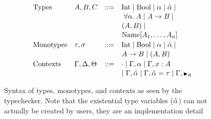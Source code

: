 \begin{figure}[h]
  \centering
  \begin{minipage}{0.5\textwidth}
  \[
      \begin{array}{llcl}
      \text{Types} & A, B, C & \bnfas &
            \Inttype \bnfalt \Booltype \bnfalt \alpha \bnfalt \ahat \bnfalt 
            \\[1pt] &&&\!\!\!\;\;\;
            \alltype{\alpha}{A} \bnfalt A \arr B \bnfalt
            \\[1pt] &&&\!\!\!\;\;
            (A, B) \bnfalt
            \\[1pt] &&&\!\!\!\;\;
            \Unionname[A_1, \dots, A_n]
      \\[2pt]
      \text{Monotypes} & \tau,\sigma & \bnfas &
            \Inttype \bnfalt \Booltype \bnfalt \alpha \bnfalt \ahat \bnfalt 
            \\[1pt] &&&\!\!\!\;\;
            A \arr B \bnfalt (A, B)
        \\[2pt]
      \text{Contexts} & \Gamma, \Delta, \Theta & \bnfas &
                  \cdot
                  \bnfalt \Gamma, \alpha 
                  \bnfalt \Gamma, x:A
                  \\[1pt] &&&\!\!\!\;\;
                  \bnfalt \Gamma, \ahat
                  \bnfalt \Gamma, \hypeq{\ahat}{\tau}
                  \bnfalt \Gamma, \MonnierComma{\ahat}
      \end{array}
  \]
  
  \captionsetup{justification=centering}\caption{Syntax of types, monotypes, and contexts as seen by the typechecker. Note that the existential type variables ($\hat{\alpha}$) can not actually be created by users, they are an implementation detail}


\end{minipage}
\end{figure}

